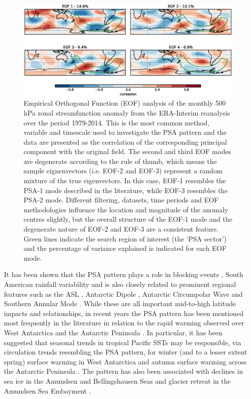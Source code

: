 \begin{figure}
\begin{center}
\includegraphics[width=1\columnwidth]{figures/psa/eof-sf_ERAInterim_500hPa_monthly_native-sh-zonal-anom.eps}
\caption[EOF analysis of the monthly 500 hPa zonal streamfunction anomaly]{\label{fig:eof}
Empirical Orthogonal Function (EOF) analysis of the monthly 500 hPa zonal streamfunction anomaly from the ERA-Interim reanalysis over the period 1979-2014. This is the most common method, variable and timescale used to investigate the PSA pattern and the data are presented as the correlation of the corresponding principal component with the original field. The second and third EOF modes are degenerate according to the \citet{North1982} rule of thumb, which means the sample eignenvectors (i.e. EOF-2 and EOF-3) represent a random mixture of the true eigenvectors. In this case, EOF-1 resembles the PSA-1 mode described in the literature, while EOF-3 resembles the PSA-2 mode. Different filtering, datasets, time periods and EOF methodologies influence the location and magnitude of the anomaly centres slightly, but the overall structure of the EOF-1 mode and the degenerate nature of EOF-2 and EOF-3 are a consistent feature. Green lines indicate the search region of interest (the `PSA sector') and the percentage of variance explained is indicated for each EOF mode.%
}
\end{center}
\end{figure}

It has been shown that the PSA pattern plays a role in blocking events \citep{Sinclair1997,Renwick1999}, South American rainfall variability \citep{Mo2001} and is also closely related to prominent regional features such as the ASL \citep{Turner2013}, Antarctic Dipole \citep{Yuan2001}, Antarctic Circumpolar Wave \citep{Christoph1998} and Southern Annular Mode \citep[SAM; e.g.][]{Ding2012}. While these are all important mid-to-high latitude impacts and relationships, in recent years the PSA pattern has been mentioned most frequently in the literature in relation to the rapid warming observed over West Antarctica and the Antarctic Peninsula \citep{Nicolas2014}. In particular, it has been suggested that seasonal trends in tropical Pacific SSTs may be responsible, via circulation trends resembling the PSA pattern, for winter (and to a lesser extent spring) surface warming in West Antarctica \citep{Ding2011} and autumn surface warming across the Antarctic Peninsula \citep{Ding2013}. The pattern has also been associated with declines in sea ice in the Amundsen and Bellingshausen Seas \citep{Schneider2012} and glacier retreat in the Amundsen Sea Embayment \citep{Steig2012}.

